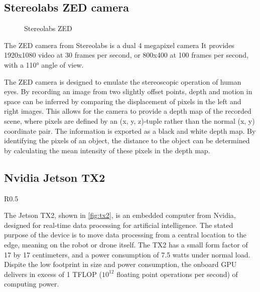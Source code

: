 \documentclass[\rootfolder/main.tex]{subfiles}
\begin{document}

\subsection{Stereolabs ZED camera}

\begin{figure}
    \caption{Stereolabs ZED}
    \label{fig:zed-camera}
\end{figure}

The ZED camera from Stereolabs is a dual 4 megapixel camera
It provides 1920x1080 video at 30 frames per second, or 800x400 at 100 frames per second, with a \ang{110} angle of view.

The ZED camera is designed to emulate the stereoscopic operation of human eyes.
By recording an image from two slightly offset points, depth and motion in space can be inferred by comparing the displacement of pixels in the left and right images.
This allows for the camera to provide a depth map of the recorded scene, where pixels are defined by an (x, y, z)-tuple rather than the normal (x, y) coordinate pair.
The information is exported as a black and white depth map.
By identifying the pixels of an object, the distance to the object can be determined by calculating the mean intensity of these pixels in the depth map.


\subsection{Nvidia Jetson TX2}

\begin{wrapfigure}{R}{0.5\columnwidth}
\caption[Nvidia Jetson TX2 development kit]{Nvidia Jetson TX2 development kit, image courtesy of Nvidia\label{fig:tx2}}
\end{wrapfigure}

The Jetson TX2, shown in \cref{fig:tx2}, is an embedded computer from Nvidia, designed for real-time data processing for artificial intelligence.
The stated purpose of the device is to move data processing from a central location to the edge, meaning on the robot or drone itself.
The TX2 has a small form factor of 17 by 17 centimeters, and a power consumption of 7.5 watts under normal load.
Dispite the low footprint in size and power consumption, the onboard GPU delivers in excess of 1 TFLOP ($10^{12}$ floating point operations per second) of computing power.
\end{document}

